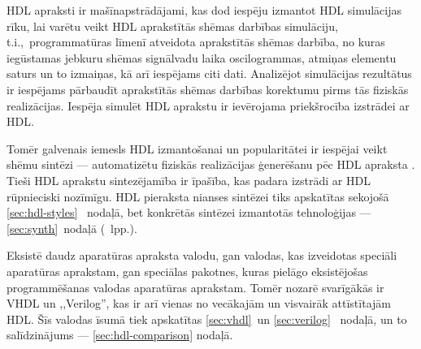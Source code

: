HDL apraksti ir mašīn\-apstrādājami, kas dod iespēju izmantot
HDL simulācijas rīku, lai varētu veikt HDL aprakstītās shēmas 
darbības simulāciju, t.i.,~programmatūras līmenī 
atveidota aprakstītās shēmas darbība, no kuras iegūstamas jebkuru
shēmas signālvadu laika oscilogrammas, atmiņas elementu saturs un to izmaiņas,
kā arī iespējams citi dati. Analizējot simulācijas rezultātus ir 
iespējams pārbaudīt aprakstītās shēmas darbības korektumu pirms
tās fiziskās realizācijas. Iespēja simulēt HDL aprakstu ir ievērojama
priekšrocība izstrādei ar HDL.

Tomēr galvenais iemesls HDL izmantošanai un popularitātei ir iespējai veikt 
shēmu sintēzi --- automatizētu fiziskās realizācijas ģenerēšanu pēc HDL apraksta
\cite{HDL}\cite{Perry-VHDL}\cite{Vahid-RTL}. Tieši HDL aprakstu sintezējamība ir
īpašība, kas padara izstrādi ar HDL rūpnieciski nozīmīgu.
HDL pieraksta nianses sintēzei tiks apskatītas sekojošā \ref{sec:hdl-styles}~%
nodaļā, bet konkrētās sintēzei izmantotās tehnoloģijas --- 
\ref{sec:synth}~nodaļā (\pageref{sec:synth}~lpp.).

Eksistē daudz aparatūras apraksta valodu, gan valodas, kas izveidotas
speciāli aparatūras aprakstam, gan speciālas pakotnes, kuras pielāgo
eksistējošas programmēšanas valodas aparatūras aprakstam.
Tomēr nozarē svarīgākās ir VHDL un ,,Verilog'', kas ir arī
vienas no vecākajām un visvairāk attīstītajām HDL.
Šīs valodas īsumā tiek apskatītas \ref{sec:vhdl}~un \ref{sec:verilog}~%
nodaļā, un to salīdzinājums --- \ref{sec:hdl-comparison} nodaļā.

 \clearpage %


